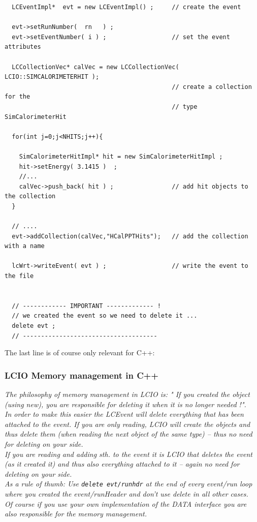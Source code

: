 \documentclass[twoside]{article}
\begin{document}
\begin{verbatim}
  LCEventImpl*  evt = new LCEventImpl() ;     // create the event 

  evt->setRunNumber(  rn   ) ;
  evt->setEventNumber( i ) ;                  // set the event attributes

  LCCollectionVec* calVec = new LCCollectionVec( LCIO::SIMCALORIMETERHIT );   
                                              // create a collection for the 
                                              // type SimCalorimeterHit

  for(int j=0;j<NHITS;j++){
  
    SimCalorimeterHitImpl* hit = new SimCalorimeterHitImpl ;
    hit->setEnergy( 3.1415 )  ;
    //...  
    calVec->push_back( hit ) ;                // add hit objects to the collection
  }

  // ....
  evt->addCollection(calVec,"HCalPPTHits");   // add the collection with a name

  lcWrt->writeEvent( evt ) ;                  // write the event to the file


  // ------------ IMPORTANT ------------- ! 
  // we created the event so we need to delete it ...
  delete evt ;
  // -------------------------------------
\end{verbatim}

The last line is of course only relevant for C++:

\subsubsection{ LCIO Memory management in C++} \label{cppmem}
{\em The philosophy of memory management in LCIO is: " If you created the object (using new),
you are responsible for deleting it when it is no longer needed !".\\
In order to make this easier the LCEvent will delete everything that has been attached to the event.
If you are only reading, LCIO will create the objects and thus delete them (when reading the next 
object of the same type) -- thus no need for deleting on your side.\\
If you are reading and adding sth. to the event it is  LCIO that deletes the event 
(as it created it) and thus also everything attached to it -- again no need for deleting on your 
side.\\
As a rule of thumb: Use \verb$delete evt/runhdr$ at the end of every event/run loop where you 
created the event/runHeader and don't use delete in all other cases.\\
Of course if you use your own implementation of the DATA interface you are also responsible for the 
memory management.}
 
\end{document}

